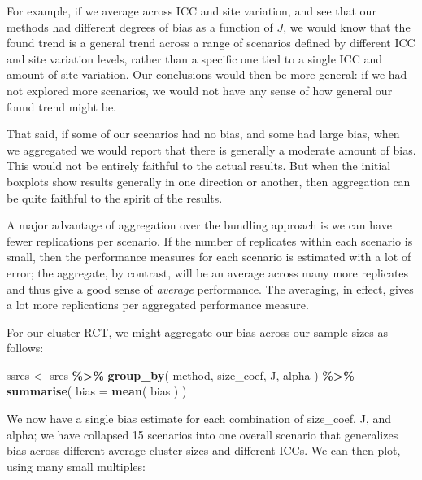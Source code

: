 \documentclass[
]{book}
\newenvironment{Shaded}{\begin{snugshade}}{\end{snugshade}}
\newcommand{\AttributeTok}[1]{\textcolor[rgb]{0.13,0.29,0.53}{#1}}
\newcommand{\FunctionTok}[1]{\textcolor[rgb]{0.13,0.29,0.53}{\textbf{#1}}}
\newcommand{\NormalTok}[1]{#1}
\newcommand{\OtherTok}[1]{\textcolor[rgb]{0.56,0.35,0.01}{#1}}
\newcommand{\SpecialCharTok}[1]{\textcolor[rgb]{0.81,0.36,0.00}{\textbf{#1}}}
\begin{document}
For example, if we average across ICC and site variation, and see that our methods had different degrees of bias as a function of \(J\), we would know that the found trend is a general trend across a range of scenarios defined by different ICC and site variation levels, rather than a specific one tied to a single ICC and amount of site variation.
Our conclusions would then be more general: if we had not explored more scenarios, we would not have any sense of how general our found trend might be.

That said, if some of our scenarios had no bias, and some had large bias, when we aggregated we would report that there is generally a moderate amount of bias.
This would not be entirely faithful to the actual results.
But when the initial boxplots show results generally in one direction or another, then aggregation can be quite faithful to the spirit of the results.

A major advantage of aggregation over the bundling approach is we can have fewer replications per scenario.
If the number of replicates within each scenario is small, then the performance measures for each scenario is estimated with a lot of error; the aggregate, by contrast, will be an average across many more replicates and thus give a good sense of \emph{average} performance.
The averaging, in effect, gives a lot more replications per aggregated performance measure.

For our cluster RCT, we might aggregate our bias across our sample sizes as follows:

\begin{Shaded}
\begin{Highlighting}[]
\NormalTok{ssres }\OtherTok{\textless{}{-}} 
\NormalTok{  sres }\SpecialCharTok{\%\textgreater{}\%} 
  \FunctionTok{group\_by}\NormalTok{( method, size\_coef, J, alpha ) }\SpecialCharTok{\%\textgreater{}\%}
  \FunctionTok{summarise}\NormalTok{( }\AttributeTok{bias =} \FunctionTok{mean}\NormalTok{( bias ) )}
\end{Highlighting}
\end{Shaded}

We now have a single bias estimate for each combination of size\_coef, J, and alpha; we have collapsed 15 scenarios into one overall scenario that generalizes bias across different average cluster sizes and different ICCs.
We can then plot, using many small multiples:
\end{document}
